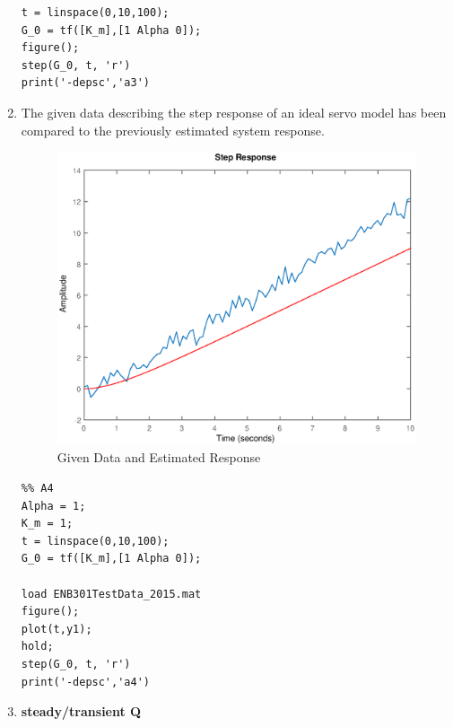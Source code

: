 \documentclass[11pt,a4paper]{article}
\begin{document}
\begin{enumerate}
\begin{lstlisting}
t = linspace(0,10,100);
G_0 = tf([K_m],[1 Alpha 0]);
figure();
step(G_0, t, 'r')
print('-depsc','a3')
	\end{lstlisting}
    
    
    
    
    \pagebreak
	\item The given data describing the step response of an ideal servo model has been compared to the previously estimated system response. 
    \begin{figure}[H]
	\centering
	\includegraphics[width=.8\textwidth]{PreLach/a4.eps}
	\caption{\label{fig:datacomp}Given Data and Estimated Response}
	\end{figure}
    \begin{lstlisting}
%% A4    
Alpha = 1;
K_m = 1;
t = linspace(0,10,100);
G_0 = tf([K_m],[1 Alpha 0]);
    
load ENB301TestData_2015.mat
figure();
plot(t,y1);
hold;
step(G_0, t, 'r')
print('-depsc','a4')
	\end{lstlisting}
  
  
  
  
  
    \item \textbf{steady/transient Q}
    
    
    

\end{enumerate}
\end{document}
